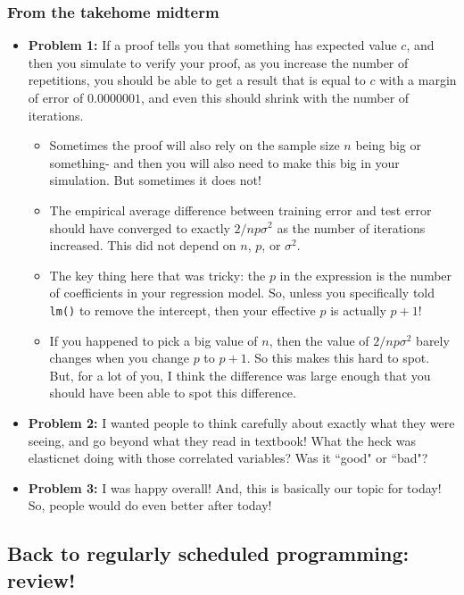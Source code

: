 \subsubsection{From the takehome midterm}

\begin{itemize}
\item \textbf{Problem 1:} If a proof tells you that something has expected value $c$, and then you simulate to verify your proof, as you increase the number of repetitions, you should be able to get a result that is equal to $c$ with a margin of error of $0.0000001$, and even this should shrink with the number of iterations. 
\begin{itemize}
\item Sometimes the proof will also rely on the sample size $n$ being big or something- and then you will also need to make this big in your simulation. But sometimes it does not! 
\item The empirical average difference between training error and test error should have converged to exactly $2/n p \sigma^2$ as the number of iterations increased. This did not depend on $n$, $p$, or $\sigma^2$.
\item The key thing here that was tricky: the $p$ in the expression is the number of coefficients in your regression model. So, unless you specifically told \texttt{lm()} to remove the intercept, then your effective $p$ is actually $p+1$!
\item If you happened to pick a big value of $n$, then the value of $2/n p \sigma^2$ barely changes when you change $p$ to $p+1$. So this makes this hard to spot. But, for a lot of you, I think the difference was large enough that you should have been able to spot this difference.
\end{itemize}
\item \textbf{Problem 2:} I wanted people to think carefully about exactly what they were seeing, and go beyond what they read in textbook! What the heck was elasticnet doing with those correlated variables? Was it ``good" or ``bad"? 
\item \textbf{Problem 3:} I was happy overall! And, this is basically our topic for today! So, people would do even better after today! 
\end{itemize}

\subsection{Back to regularly scheduled programming: review!}

